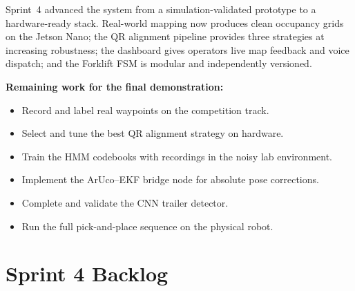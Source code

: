 \documentclass[conference]{IEEEtran}
\begin{document}
Sprint~4 advanced the system from a simulation-validated prototype to a
hardware-ready stack. Real-world mapping now produces clean occupancy grids
on the Jetson Nano; the QR alignment pipeline provides three strategies at
increasing robustness; the dashboard gives operators live map feedback and
voice dispatch; and the Forklift FSM is modular and independently versioned.

\textbf{Remaining work for the final demonstration:}
\begin{itemize}[noitemsep, leftmargin=*]
  \item Record and label real waypoints on the competition track.
  \item Select and tune the best QR alignment strategy on hardware.
  \item Train the HMM codebooks with recordings in the noisy lab environment.
  \item Implement the ArUco--EKF bridge node for absolute pose corrections.
  \item Complete and validate the CNN trailer detector.
  \item Run the full pick-and-place sequence on the physical robot.
\end{itemize}

\section*{Sprint 4 Backlog}
\end{document}

